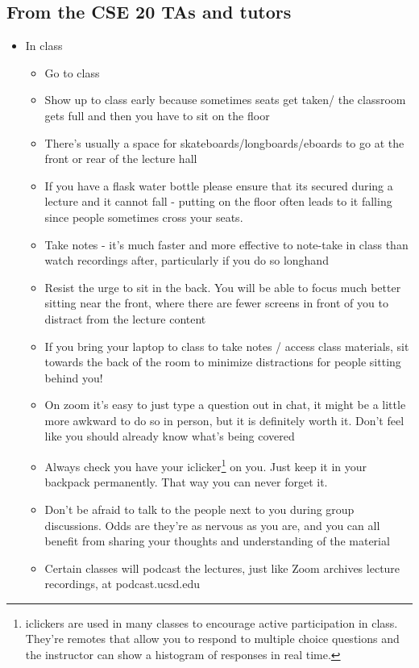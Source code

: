 \documentclass[12pt, oneside]{article}
\begin{document}
\subsection*{From the CSE 20 TAs and tutors}
\begin{itemize}
\item In class
\begin{itemize}
\item Go to class
\item Show up to class early because sometimes seats get taken/ the classroom gets full and then you have to sit on the floor
\item There's usually a space for skateboards/longboards/eboards to go at the front or rear of the lecture hall 
\item If you have a flask water bottle please ensure that its secured during a lecture and it cannot fall - putting on the floor often leads to it falling since people sometimes cross your seats.
\item Take notes - it's much faster and more effective to note-take in class than watch recordings after, particularly if you do so longhand
\item Resist the urge to sit in the back. You will be able to focus much better sitting near the front, where there are fewer screens in front of you to distract from the lecture content
\item If you bring your laptop to class to take notes / access class materials, sit towards the back of the room to minimize distractions for people sitting behind you!
\item On zoom it's easy to just type a question out in chat, it might be a little more awkward to do so in person, but it is definitely worth it. Don't feel like you should already know what's being covered
\item Always check you have your iclicker\footnote{iclickers are used in many classes to encourage active participation in class. They're remotes that allow you to respond to multiple choice questions and the instructor can show a histogram of responses in real time.} on you. Just keep it in your backpack permanently. That way you can never forget it. 
\item Don't be afraid to talk to the people next to you during group discussions. Odds are they're as nervous as you are, and you can all benefit from sharing your thoughts and understanding of the material 
\item Certain classes will podcast the lectures, just like Zoom archives lecture recordings, at podcast.ucsd.edu

\end{itemize}
\end{itemize}
\end{document}
